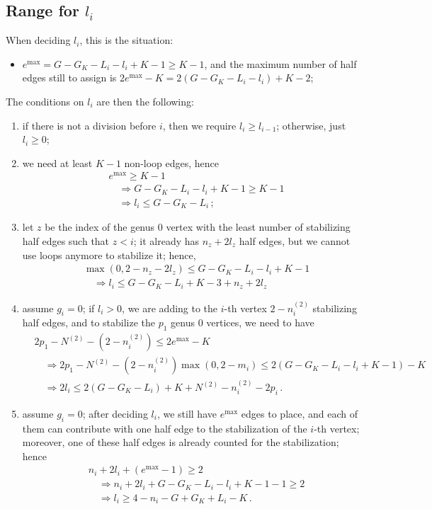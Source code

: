 \documentclass{amsart}
\theoremstyle{plain}
\theoremstyle{definition}
\DeclareMathOperator{\MAX}{max}
\begin{document}
\subsection{Range for $l_i$}

When deciding $l_{i}$, this is the situation:
\begin{itemize}
\item $e^{\MAX} = G - G_K - L_i - l_i + K - 1 \geq K-1$, and the
  maximum number of half edges still to assign is $2e^{\MAX} - K = 2(G
  - G_K - L_i - l_i) + K - 2$;
\end{itemize}

The conditions on $l_i$ are then the following:
\begin{enumerate}
\item if there is not a division before $i$, then we require $l_i \geq
  l_{i-1}$; otherwise, just $l_i \geq 0$;
\item we need at least $K-1$ non-loop edges, hence
  \begin{align*}
    &e^{\MAX} \geq K-1\\
    &\quad\Rightarrow G - G_K - L_i - l_i + K-1 \geq K-1\\
    &\quad\Rightarrow l_i \leq G - G_K - L_i\,\text{;}
  \end{align*}
\item let $z$ be the index of the genus $0$ vertex with the least
  number of stabilizing half edges such that $z < i$; it already has
  $n_z + 2l_z$ half edges, but we cannot use loops anymore to
  stabilize it; hence,
  \begin{align*}
    &\max(0, 2-n_z-2l_z) \leq G - G_K - L_i - l_i + K - 1\\
    &\quad\Rightarrow l_i \leq G - G_K - L_i + K - 3 + n_z + 2l_z
  \end{align*}
\item assume $g_i = 0$; if $l_i > 0$, we are adding to the $i$-th
  vertex $2-n^{(2)}_i$ stabilizing half edges, and to stabilize the
  $p_1$ genus $0$ vertices, we need to have
  \begin{align*}
    &2 p_1 - N^{(2)} - (2-n^{(2)}_i) \leq 2e^{\MAX} - K\\
    &\quad\Rightarrow 2p_1 - N^{(2)} - (2-n^{(2)}_i) \max(0, 2-m_i) \leq 2(G - G_K - L_i - l_i + K - 1) - K\\
    &\quad\Rightarrow 2l_i \leq 2(G - G_K - L_i) + K + N^{(2)} - n^{(2)}_i - 2p_i\,\text{.}
  \end{align*}
\item assume $g_i = 0$; after deciding $l_i$, we still have $e^{\MAX}$
  edges to place, and each of them can contribute with one half edge
  to the stabilization of the $i$-th vertex; moreover, one of these
  half edges is already counted for the stabilization; hence
  \begin{align*}
    &n_i + 2l_i + (e^{\MAX} - 1) \geq 2\\
    &\quad\Rightarrow n_i + 2l_i + G - G_K - L_i - l_i + K - 1 - 1 \geq 2\\
    &\quad\Rightarrow l_i \geq 4 - n_i - G + G_K + L_i - K\,\text{.}
  \end{align*}
\end{enumerate}
\end{document}

